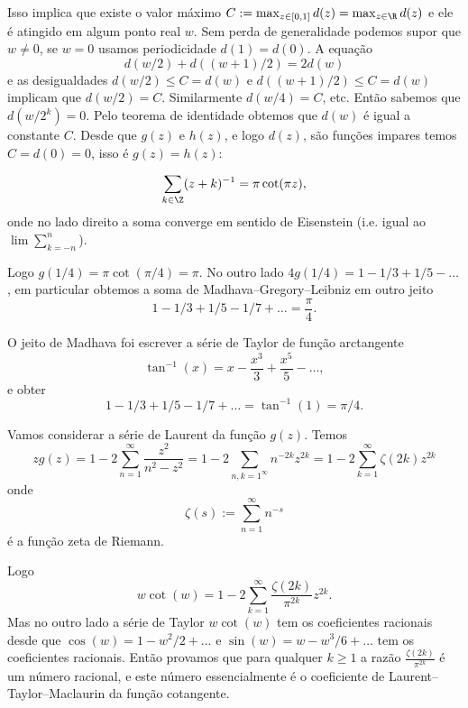 Isso implica que existe o valor máximo $C := \max_{z\in [0,1]} d(z) = \max_{z\in\R} d(z)$
e ele é atingido em algum ponto real $w$.
Sem perda de generalidade podemos supor que $w\neq 0$, se $w=0$ usamos periodicidade $d(1) = d(0)$.
A equação
\[ d(w/2) + d((w+1)/2) = 2 d(w) \]
e as desigualdades $d(w/2) \leq C = d(w)$ e $d((w+1)/2) \leq C = d(w)$ implicam
que $d(w/2) = C$. Similarmente $d(w/4) = C$, etc. Então sabemos que
$d(w/2^k)=0$. Pelo teorema de identidade obtemos que $d(w)$ é igual a constante $C$.
Desde que $g(z)$ e $h(z)$, e logo $d(z)$, são funções impares temos $C = d(0) = 0$,
isso é $g(z) = h(z)$:

\begin{equation}
\sum_{k\in\Z} (z+k)^{-1} = \pi \cot(\pi z),
\end{equation}
onde no lado direito a soma converge em sentido de Eisenstein
(i.e. igual ao $\lim \sum_{k=-n}^n$).

Logo $g(1/4) = \pi \cot(\pi/4) = \pi$.
No outro lado
$4 g(1/4) = 1 - 1/3 + 1/5 - \dots$,
em particular obtemos a soma de Madhava--Gregory--Leibniz em outro jeito
\[ 1 - 1/3 + 1/5 - 1/7 + \dots = \frac{\pi}{4}. \]

O jeito de Madhava foi escrever a série de Taylor de função arctangente
\[ \tan^{-1}(x) = x - \frac{x^3}3 + \frac{x^5}5 - \dots, \]
e obter
\[ 1 - 1/3 + 1/5 - 1/7 + \dots = \tan^{-1}(1) = \pi/4. \]


Vamos considerar a série de Laurent da função $g(z)$. Temos
\begin{equation}
z g(z) = 1 - 2 \sum_{n=1}^\infty \frac{z^2}{n^2-z^2} = 1 - 2 \sum_{n,k=1^\infty} n^{-2k} z^{2k}
= 1 - 2 \sum_{k=1}^\infty \zeta(2k) z^{2k}
\end{equation}
onde
\begin{equation}
\zeta(s) := \sum_{n=1}^\infty n^{-s}
\end{equation}
é a função zeta de Riemann.

Logo
\begin{equation}
w \cot(w) = 1 - 2 \sum_{k=1}^\infty \frac{\zeta(2k)}{\pi^{2k}} z^{2k}.
\end{equation}
Mas no outro lado a série de Taylor $w \cot(w)$ tem os coeficientes racionais desde
que $\cos(w) = 1 - w^2/2 + \dots$ e $\sin(w) = w - w^3/6 + \dots$ tem os coeficientes racionais.
Então provamos que para qualquer $k\geq 1$ a razão $\frac{\zeta(2k)}{\pi^{2k}}$
é um número racional, e este número essencialmente é o coeficiente de Laurent--Taylor--Maclaurin
da função cotangente.

